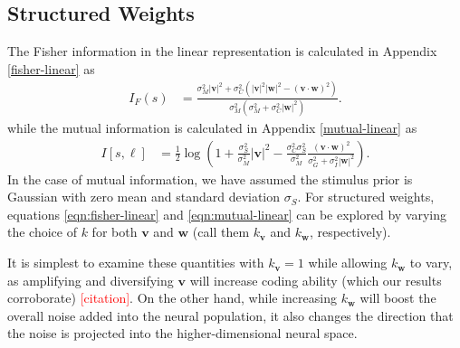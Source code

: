 \documentclass[11pt]{article}
\begin{document}
	\subsection{Structured Weights}
	The Fisher information in the linear representation is calculated in Appendix \ref{fisher-linear} as 
	\begin{align}
		I_F(s) &= \frac{\sigma_M^2 |\mathbf{v}|^2 + \sigma_C^2 \left(|\mathbf{v}|^2|\mathbf{w}|^2 - (\mathbf{v}\cdot\mathbf{w})^2\right)}{\sigma_M^2 (\sigma_M^2 + \sigma_C^2 |\mathbf{w}|^2)}. \label{eqn:fisher-linear}
	\end{align}
	while the mutual information is calculated in Appendix \ref{mutual-linear} as
	\begin{align}
		I[s, \boldsymbol{\ell}] &= \frac{1}{2} \log \left(1 + \frac{\sigma_S^2}{\sigma_M^2} |\mathbf{v}|^2 - \frac{\sigma_C^2 \sigma_S^2}{\sigma_M^2} \frac{(\mathbf{v}\cdot\mathbf{w})^2}{\sigma_G^2 + \sigma_I^2 |\mathbf{w}|^2}\right). \label{eqn:mutual-linear}
	\end{align}
	In the case of mutual information, we have assumed the stimulus prior is Gaussian with zero mean and standard deviation $\sigma_S$. For structured weights, equations \ref{eqn:fisher-linear} and \ref{eqn:mutual-linear} can be explored by varying the choice of $k$ for both $\mathbf{v}$ and $\mathbf{w}$ (call them $k_{\mathbf{v}}$ and $k_{\mathbf{w}}$, respectively).
	
	It is simplest to examine these quantities with $k_{\mathbf{v}}=1$ while allowing $k_{\mathbf{w}}$ to vary, as amplifying and diversifying $\mathbf{v}$ will increase coding ability (which our results corroborate) \textcolor{red}{[citation]}. On the other hand, while increasing $k_{\mathbf{w}}$ will boost the overall noise added into the neural population, it also changes the direction that the noise is projected into the higher-dimensional neural space. 
	
\end{document}
